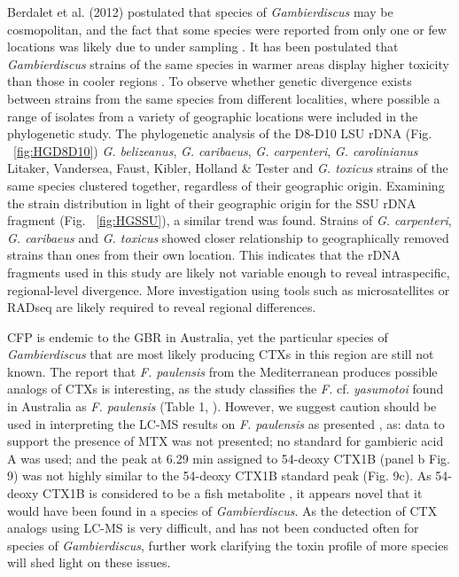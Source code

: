 \documentclass[12pt]{article}
\begin{document}
Berdalet et al. (2012) postulated that species of \textit{Gambierdiscus} may be cosmopolitan, and the fact that some species were reported from only one or few locations was likely due to under sampling \citep{litaker2010global}. 
It has been postulated that \textit{Gambierdiscus} strains of the same species  in warmer areas display higher toxicity than those in cooler regions \citep{bomber1989epiphytism}. 
To observe whether genetic divergence exists between strains from the same species from different localities, where possible a range of isolates from a variety of geographic locations were included in the phylogenetic study. 
The phylogenetic analysis of the D8-D10 LSU rDNA (Fig. ~\ref{fig:HGD8D10})  \emph{G. belizeanus}, \emph{G. caribaeus}, \emph{G. carpenteri},  \emph{G. carolinianus} Litaker, Vandersea, Faust, Kibler, Holland \& Tester and \emph{G. toxicus} strains of the same species clustered together, regardless of their geographic origin. 
Examining the strain distribution in light of their geographic origin for the SSU rDNA fragment (Fig. ~\ref{fig:HGSSU}), a similar trend was found. 
Strains of \emph{G. carpenteri}, \emph{G. caribaeus} and \emph{G. toxicus} showed closer relationship to geographically removed strains than ones from their own location.
This indicates that the rDNA fragments used in this study are likely not variable enough to reveal intraspecific, regional-level divergence. 
More investigation using tools such as microsatellites or RADseq are likely required to reveal regional differences.

CFP is endemic to the GBR in Australia, yet the particular species of \textit{Gambierdiscus} that are most likely producing CTXs in this region are still not known. 
The report that \textit{F. paulensis} from the Mediterranean produces possible analogs of CTXs \citep{laza2016characterization} is interesting, as the study classifies the \textit{F.} cf. \textit{yasumotoi} found in Australia as \textit{F. paulensis} (Table 1, \citep{murray2014molecular}). 
However, we suggest caution should be used in interpreting the LC-MS results on \textit{F. paulensis} as presented \citep{laza2016characterization}, as: data to support the presence of MTX was not presented; no standard for gambieric acid A was used; and the peak at 6.29 min assigned to 54-deoxy CTX1B (panel b Fig. 9) was not highly similar to the 54-deoxy CTX1B standard peak (Fig. 9c). 
As 54-deoxy CTX1B is considered to be a fish metabolite \citep{yogi2011detailed}, it appears novel that it would have been found in a species of \textit{Gambierdiscus}. 
As the detection of CTX analogs using LC-MS is very difficult, and has not been conducted often for species of \textit{Gambierdiscus}, further work clarifying the toxin profile of more species will shed light on these issues.\\
\end{document}
